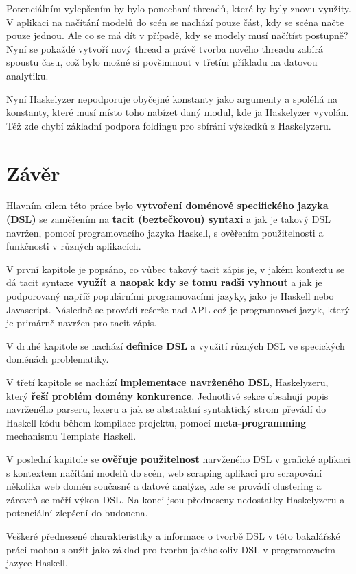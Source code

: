 \documentclass[male,czech]{kithesis}
\begin{document}
Potenciálním vylepšením by bylo ponechaní threadů, 
které by byly znovu využity.
V aplikaci na načítání modelů do scén se nachází pouze část,
kdy se scéna načte pouze jednou.
Ale co se má dít v případě, 
kdy se modely musí načítíst postupně?
Nyní se pokaždé vytvoří nový thread a 
právě tvorba nového threadu zabírá spoustu času,
což bylo možné si povšimnout v třetím příkladu na datovou analytiku.

Nyní Haskelyzer nepodporuje obyčejné konstanty jako argumenty a
spoléhá na konstanty,
které musí místo toho nabízet daný modul, 
kde ja Haskelyzer vyvolán.
Též zde chybí základní podpora foldingu pro sbírání výskedků z Haskelyzeru.

\chapter{Závěr}
Hlavním cílem této práce bylo \textbf{vytvoření doménově specifického jazyka (DSL)} se zaměřením 
na \textbf{tacit (beztečkovou) syntaxi} a 
jak je takový DSL navržen, 
pomocí programovacího jazyka Haskell, 
s ověřením použitelnosti a funkčnosti v různých aplikacích.

V první kapitole je popsáno, 
co vůbec takový tacit zápis je,
v jakém kontextu se dá tacit syntaxe \textbf{využít a naopak kdy se tomu radši vyhnout} a
jak je podporovaný napříč populárními programovacími jazyky,
jako je Haskell nebo Javascript. 
Následně se provádí rešerše nad APL což je programovací jazyk,
který je primárně navržen pro tacit zápis.

V druhé kapitole se nachází \textbf{definice DSL} a
využití různých DSL ve specických doménách problematiky.

V třetí kapitole se nachází \textbf{implementace navrženého DSL}, 
Haskelyzeru, 
který \textbf{řeší problém domény konkurence}.
Jednotlivé sekce obsahují popis navrženého parseru, 
lexeru a 
jak se abstraktní syntaktický strom převádí 
do Haskell kódu během kompilace projektu, 
pomocí \textbf{meta-programming} mechanismu Template Haskell.

V poslední kapitole se \textbf{ověřuje použitelnost} narvženého DSL v 
grafické aplikaci s kontextem načítání modelů do scén,
web scraping aplikaci pro scrapování několika web domén současně a 
datové analýze, 
kde se provádí clustering a zároveň se měří výkon DSL.
Na konci jsou předneseny nedostatky Haskelyzeru a 
potenciální zlepšení do budoucna.

Veškeré přednesené charakteristiky a 
informace o tvorbě DSL v této bakalářské práci
mohou sloužit jako základ pro tvorbu jakéhokoliv DSL v programovacím jazyce Haskell.
\end{document}
